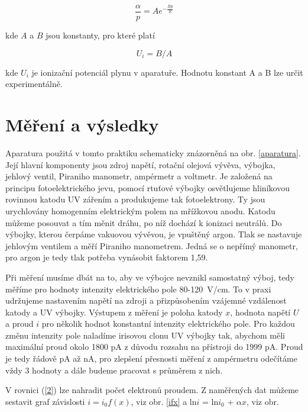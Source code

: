 \documentclass[a4paper,12pt]{article}
\begin{document}
\begin{equation}
	\frac{\alpha}{p} = A e^{-\frac{Bp}{E}} 
	\label{4}
\end{equation}

kde $A$ a $B$ jsou konstanty, pro které platí

\begin{equation}
	U_i = B/A
	\label{5}
\end{equation}

kde $U_i$ je ionizační potenciál plynu v aparatuře. Hodnotu konstant A a B lze určit experimentálně.

\section{Měření a výsledky}

Aparatura použitá v tomto praktiku schematicky znázorněná na obr. \ref{aparatura}. Její hlavní komponenty jsou zdroj napětí, rotační olejová vývěva, výbojka, jehlový ventil, Piraniho manometr, ampérmetr a voltmetr. Je založená na principu fotoelektrického jevu, pomocí rtuťové výbojky osvětlujeme hliníkovou rovinnou katodu UV zářením a produkujeme tak fotoelektrony. Ty jsou urychlovány homogenním elektrickým polem na mřížkovou anodu. Katodu můžeme posouvat a tím měnit dráhu, po níž dochází k ionizaci neutrálů. Do výbojky, kterou čerpáme vakuovou vývěvou, je vpuštěný argon. Tlak se nastavuje jehlovým ventilem a měří Piraniho manometrem. Jedná se o nepřímý manometr, pro argon je tedy tlak potřeba vynásobit faktorem 1,59.

Při měření musíme dbát na to, aby ve výbojce nevznikl samostatný výboj, tedy měříme pro hodnoty intenzity elektrického pole 80-120~V/cm. To v praxi udržujeme nastavením napětí na zdroji a přizpůsobením vzájemné vzdálenost katody a UV výbojky. Výstupem z měření je poloha katody $x$, hodnota napětí $U$ a proud $i$ pro několik hodnot konstantní intenzity elektrického pole. Pro každou změnu intenzity pole naladíme irisovou clonu UV výbojky tak, abychom měli maximální proud okolo 1800 pA z důvodu rozsahu na přístroji do 1999 pA. Proud je tedy řádově pA až nA, pro zlepšení přesnosti měření z ampérmetru odečítáme vždy 3 hodnoty a dále budeme pracovat s průměrem z nich.

V rovnici (\ref{2}) lze nahradit počet elektronů proudem. Z naměřených dat můžeme sestavit graf závislosti $i = i_0 f(x)$, viz obr. \ref{ifx} a ln$i$ = ln$i_0$ + $\alpha x$, viz obr. 
\end{document}

